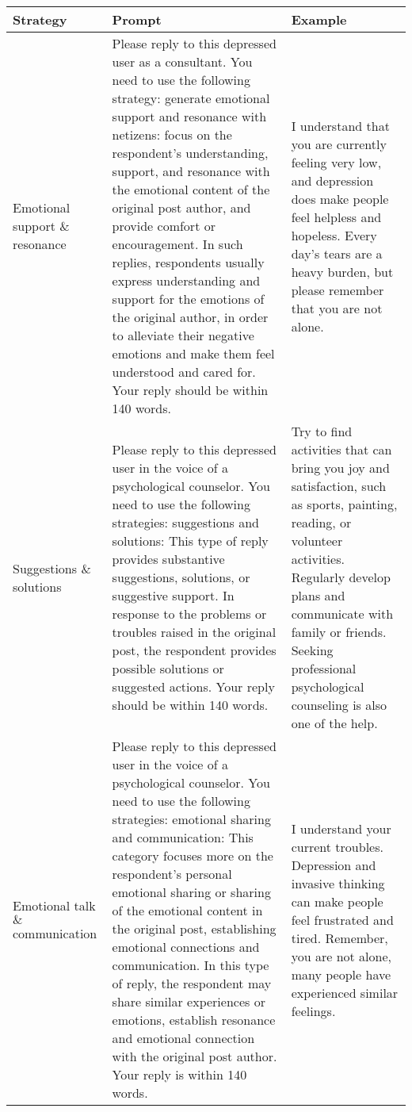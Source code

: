 \begin{table*}[th]
	\small
	\begin{tabular}{p{}|p{}|p{}}
		\toprule
		\textbf{Strategy} & \textbf{Prompt} & \textbf{Example}\\ \midrule
		Emotional support \( \mbox{\&} \) resonance & Please reply to this depressed user as a consultant. You need to use the following strategy: generate emotional support and resonance with netizens: focus on the respondent's understanding, support, and resonance with the emotional content of the original post author, and provide comfort or encouragement. In such replies, respondents usually express understanding and support for the emotions of the original author, in order to alleviate their negative emotions and make them feel understood and cared for. Your reply should be within 140 words. & I understand that you are currently feeling very low, and depression does make people feel helpless and hopeless. Every day's tears are a heavy burden, but please remember that you are not alone.  \\ \midrule
		Suggestions \( \mbox{\&} \) solutions &  Please reply to this depressed user in the voice of a psychological counselor. You need to use the following strategies: suggestions and solutions: This type of reply provides substantive suggestions, solutions, or suggestive support. In response to the problems or troubles raised in the original post, the respondent provides possible solutions or suggested actions. Your reply should be within 140 words. & Try to find activities that can bring you joy and satisfaction, such as sports, painting, reading, or volunteer activities. Regularly develop plans and communicate with family or friends. Seeking professional psychological counseling is also one of the help. \\ \midrule
        Emotional talk \( \mbox{\&} \) communication & Please reply to this depressed user in the voice of a psychological counselor. You need to use the following strategies: emotional sharing and communication: This category focuses more on the respondent's personal emotional sharing or sharing of the emotional content in the original post, establishing emotional connections and communication. In this type of reply, the respondent may share similar experiences or emotions, establish resonance and emotional connection with the original post author. Your reply is within 140 words. & I understand your current troubles. Depression and invasive thinking can make people feel frustrated and tired. Remember, you are not alone, many people have experienced similar feelings. \\ \midrule

\end{tabular}
\end{table*}
